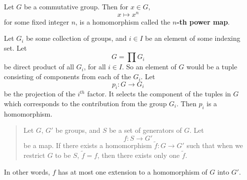 \begin{ex}
Let $G$ be a commutative group. Then for $x\in G$,
\begin{equation}
x\mapsto x^n
\end{equation}
for some fixed integer $n$, is a homomorphism called the
\textbf{$n$-th power map}. \qef
\end{ex}
\begin{ex}
Let $G_i$ be some collection of groups, and $i\in I$ be an
element of some indexing set. Let
\begin{equation}
G = \prod G_{i}
\end{equation}
be direct product of all $G_i$, for all $i\in I$. So an
element of $G$ would be a tuple consisting of components
from each of the $G_i$. Let
\begin{equation}
p_i:G\to G_i
\end{equation}
be the projection of the $i^{th}$ factor. It selects the
component of the tuples in $G$ which corresponds to the
contribution from the group $G_i$. Then $p_i$ is a
homomorphism. \qef
\end{ex}\begin{quote}\begin{thm}
Let $G$, $G'$ be groups, and $S$  be a set of generators of
$G$. Let
\begin{equation}
f:S\to G'
\end{equation}
be a map. If there exists a homomorphism $\widetilde{f}:G\to
G'$ such that when we restrict $G$ to be $S$,
$\widetilde{f}=f$, then there exists only one
$\widetilde{f}$. 
\end{thm}
\end{quote}
In other words, $f$ has at most one extension to a
homomorphism of $G$ into $G'$. 

